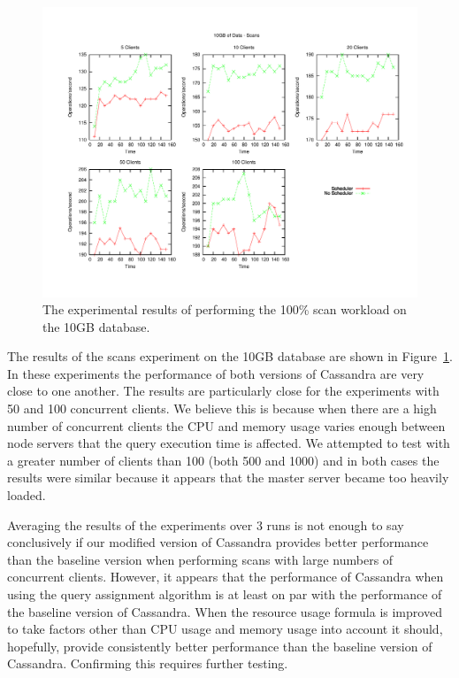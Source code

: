 \begin{figure}[t]
\centering
\includegraphics[scale=0.5]{images/10GB_Scans.pdf}
\vspace{-15pt}
\caption{The experimental results of performing the 100\% scan workload on the 10GB database.}
\label{fig:10g_scans}
\end{figure}

The results of the scans experiment on the 10GB database are shown in Figure~\ref{fig:10g_scans}. In these experiments the performance of both versions of Cassandra are very close to one another. The results are particularly close for the experiments with 50 and 100 concurrent clients. We believe this is because when there are a high number of concurrent clients the CPU and memory usage varies enough between node servers that the query execution time is affected. We attempted to test with a greater number of clients than 100 (both 500 and 1000) and in both cases the results were similar because it appears that the master server became too heavily loaded.

Averaging the results of the experiments over 3 runs is not enough to say conclusively if our modified version of Cassandra provides better performance than the baseline version when performing scans with large numbers of concurrent clients. However, it appears that the performance of Cassandra when using the query assignment algorithm is at least on par with the performance of the baseline version of Cassandra. When the resource usage formula is improved to take factors other than CPU usage and memory usage into account it should, hopefully, provide consistently better performance than the baseline version of Cassandra. Confirming this requires further testing.

